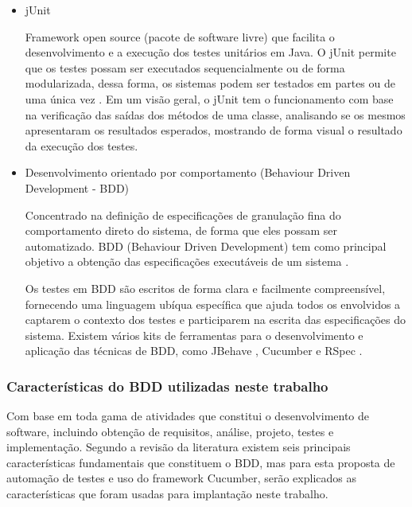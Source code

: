\begin{itemize}

	\item  jUnit 

Framework open source (pacote de software livre) que facilita o desenvolvimento e a execução dos testes unitários em Java. O jUnit permite que os testes possam ser executados sequencialmente ou de forma modularizada, dessa forma, os sistemas podem ser testados em partes ou de uma única vez \cite{JUnit}. Em um visão geral, o jUnit tem o funcionamento com base na verificação das saídas dos métodos de uma classe, analisando se os mesmos apresentaram os resultados esperados, mostrando de forma visual o resultado da execução dos testes.
	
	\item Desenvolvimento orientado por comportamento (Behaviour Driven Development - BDD)
	
Concentrado na definição de especificações de granulação fina do comportamento direto do sistema, de forma que eles possam ser automatizado. BDD (Behaviour Driven Development) tem como principal objetivo a obtenção das especificações executáveis de um sistema \cite{Solis2011}.

Os testes em BDD são escritos de forma clara e facilmente compreensível, fornecendo uma linguagem ubíqua específica que ajuda todos os envolvidos a captarem o contexto dos testes e participarem na escrita das especificações do sistema. Existem vários kits de ferramentas para o desenvolvimento e aplicação das técnicas de BDD, como JBehave \cite{JBehave}, Cucumber \cite{Cucumber} e RSpec \cite{RSpec}.

\end{itemize}

\subsubsection{Características do BDD utilizadas neste trabalho}

Com base em toda gama de atividades que constitui o desenvolvimento de software, incluindo obtenção de requisitos, análise, projeto, testes e implementação. Segundo a revisão da literatura \cite{Solis2011} existem seis principais características fundamentais que constituem o BDD, mas para esta proposta de automação de testes e uso do framework Cucumber, serão explicados as características que foram usadas para implantação neste trabalho.

